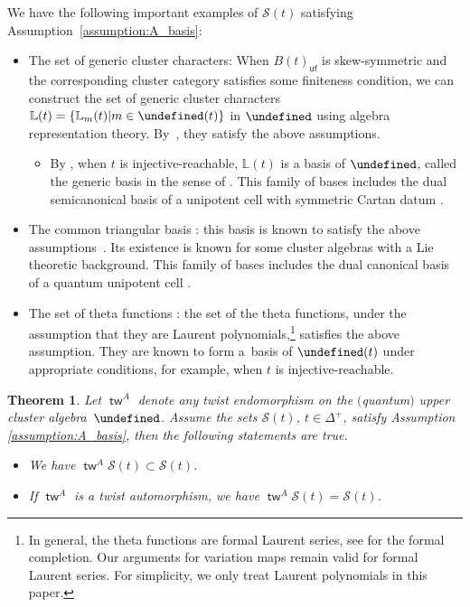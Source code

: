 \documentclass[10pt,a4paper]{amsart}
\renewcommand{\tilde}[1]{\widetilde{#1}}
\newcommand{\opname}[1]{\operatorname{\mathsf{#1}}}
\newcommand{\cS}{{\mathcal S}}
\newcommand{\gen}{\mathbb{L}}%
\newcommand{\tw}{{\tilde{w}}}
\newcommand{\ufv}{\opname{uf}}
\let\Mc\undefined
\let\upClAlg\undefined
\renewcommand{\tw}{\opname{tw}}
\newcommand{\Mc}{M^\circ}
\newcommand{\upClAlg}{\mathcal{U}^A}
\renewcommand{\tw}{\opname{tw}}
\numberwithin{equation}{section}
\newtheorem{Theorem}{Theorem}[section]
\begin{document}
We have the following important examples of $\cS(t)$ satisfying
Assumption~\ref{assumption:A_basis}:
\begin{itemize}\itemsep=0pt
\item The set of generic cluster characters: When $B(t)_{\ufv}$ is skew-symmetric
and the corresponding cluster category satisfies some finiteness condition,
we can construct the set of generic cluster characters $\gen(t)=\{\gen_{m}(t)|m\in\Mc(t)\}$
in $\upClAlg$ using algebra representation theory. By~\cite{plamondon2013generic},
they satisfy the above assumptions.
\begin{itemize}\itemsep=0pt
\item By \cite{qin2019bases}, when $t$ is injective-reachable, $\gen(t)$
is a basis of $\upClAlg$, called the generic basis in the sense of
\cite{dupont2011generic}. This family of bases includes the dual
semicanonical basis \cite{lusztig2000semicanonical} of a unipotent
cell with symmetric Cartan datum \cite{GeissLeclercSchroeer10b}.
\end{itemize}
\item The common triangular basis \cite{qin2017triangular}: this basis
is known to satisfy the above assumptions~\cite{qin2017triangular}.
Its existence is known for some cluster algebras with a Lie theoretic
background. This family of bases includes the dual canonical basis
of a quantum unipotent cell \cite{kashiwara2019laurent,qin2017triangular,qin2020dual}.
\item The set of theta functions \cite{gross2018canonical}: the set of
the theta functions, under the assumption that they are Laurent polynomials,\footnote{In general, the theta functions are formal Laurent series, see \cite{qin2019bases}
for the formal completion. Our arguments for variation maps remain
valid for formal Laurent series. For simplicity, we only treat Laurent
polynomials in this paper.} satisfies the above assumption. They
are known to form a~basis of $\upClAlg(t)$ under appropriate conditions,
for example, when $t$ is injective-reachable.
\end{itemize}
\begin{Theorem}\label{thm:twist_A_basis}
Let $\tw^{A}$ denote any twist endomorphism on the $($quantum$)$ upper cluster algebra~$\upClAlg$. Assume
the sets $\cS(t)$, $t\in \Delta^+$, satisfy Assumption {\rm \ref{assumption:A_basis}}, then the following statements are true.
\begin{itemize}\itemsep=0pt
\item[$(1)$] We have $\tw^{A}\cS(t)\subset\cS(t)$.
\item[$(2)$] If $\tw^{A}$ is a twist automorphism, we have $\tw^{A}\cS(t)=\cS(t)$.
\end{itemize}
\end{Theorem}
\end{document}
